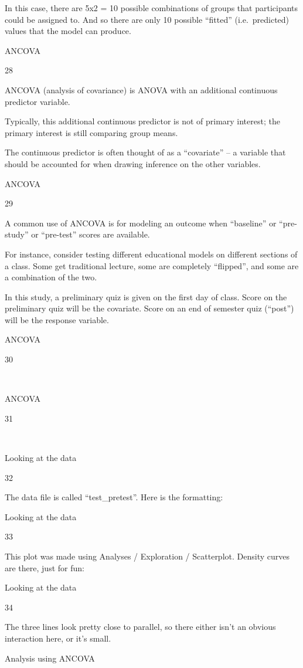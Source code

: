 \documentclass[
  letterpaper,
  DIV=11,
  numbers=noendperiod]{scrreprt}
\begin{document}
In this case, there are 5x2 = 10 possible combinations of groups that
participants could be assigned to. And so there are only 10 possible
``fitted'' (i.e.~predicted) values that the model can produce.

ANCOVA

28

ANCOVA (analysis of covariance) is ANOVA with an additional continuous
predictor variable.

Typically, this additional continuous predictor is not of primary
interest; the primary interest is still comparing group means.

The continuous predictor is often thought of as a ``covariate'' -- a
variable that should be accounted for when drawing inference on the
other variables.

ANCOVA

29

A common use of ANCOVA is for modeling an outcome when ``baseline'' or
``pre-study'' or ``pre-test'' scores are available.

For instance, consider testing different educational models on different
sections of a class. Some get traditional lecture, some are completely
``flipped'', and some are a combination of the two.

In this study, a preliminary quiz is given on the first day of class.
Score on the preliminary quiz will be the covariate. Score on an end of
semester quiz (``post'') will be the response variable.

ANCOVA

30

~

ANCOVA

31

~

Looking at the data

32

The data file is called ``test\_pretest''. Here is the formatting:

Looking at the data

33

This plot was made using Analyses / Exploration / Scatterplot. Density
curves are there, just for fun:

Looking at the data

34

The three lines look pretty close to parallel, so there either isn't an
obvious interaction here, or it's small.

Analysis using ANCOVA
\end{document}
